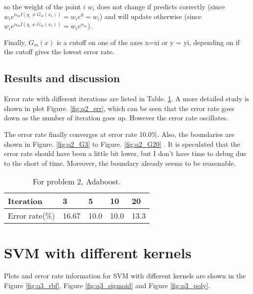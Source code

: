 \documentclass[11pt]{article}
\begin{document}
so the weight of the point $i$ $w_i$ does not change if predicts correctly (since  $w_ie^{\alpha_mI(y_i\neq G_m(x_1))} = w_ie^0 = w_i$) and will update otherwise (since  $w_ie^{\alpha_mI(y_i\neq G_m(x_1))} = w_ie^{\alpha_m}$).

Finally, $G_m(x)$ is a cutoff on one of the axes x=xi or y = yi, depending on if the cutoff gives the lowest error rate.

\subsection{Results and discussion}

Error rate with different iterations are listed in Table. \ref{tab:q2}.  A more detailed study is shown in plot Figure. \ref{fig:q2_err}, which can be seen that the error rate goes down as the number of iteration goes up. However the error rate oscillates. 


The error rate finally converges at error rate 10.0\%. Also, the boundaries are shown in Figure. \ref{fig:q2_G3}  to Figure. \ref{fig:q2_G20} . It is speculated that the error rate should have been a little bit lower, but I don't have time to debug due to the short of time. Moreover, the boundary already seems to be reasonable. 



\begin{table}[!htb]
\centering
\caption{For problem 2, Adaboost.}
\label{tab:q2}
\begin{tabular}{lllll}
\hline \hline

Iteration	&3	&5	&10		&20 \\ \hline

Error rate(\%)  &16.67	&10.0	&10.0		&13.3	\\ \hline \hline

\end{tabular}
\end{table}










\clearpage
\section{SVM with different kernels}
Plots and error rate information for SVM with different kernels are shown in the Figure \ref{fig:q3_rbf}, Figure \ref{fig:q3_sigmoid} and Figure \ref{fig:q3_poly}. 
\end{document}
